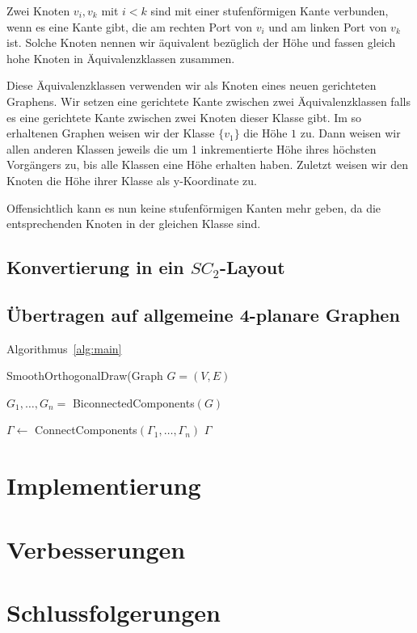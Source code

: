 \documentclass[a4paper]{scrreprt}
\theoremstyle{definition}
\begin{document}
Zwei Knoten $v_i, v_k$ mit $i < k$ sind mit einer stufenförmigen Kante verbunden, wenn es eine Kante gibt, die am rechten Port von $v_i$ und am linken Port von $v_k$ ist. Solche Knoten nennen wir äquivalent bezüglich der Höhe und fassen gleich hohe Knoten in Äquivalenzklassen zusammen.

Diese Äquivalenzklassen verwenden wir als Knoten eines neuen gerichteten Graphens. Wir setzen eine gerichtete Kante zwischen zwei Äquivalenzklassen falls es eine gerichtete Kante zwischen zwei Knoten dieser Klasse gibt. Im so erhaltenen Graphen weisen wir der Klasse $\{v_1\}$ die Höhe $1$ zu. Dann weisen wir allen anderen Klassen jeweils die um 1 inkrementierte Höhe ihres höchsten Vorgängers zu, bis alle Klassen eine Höhe erhalten haben. Zuletzt weisen wir den Knoten die Höhe ihrer Klasse als y-Koordinate zu.

Offensichtlich kann es nun keine stufenförmigen Kanten mehr geben, da die entsprechenden Knoten in der gleichen Klasse sind.

\section{Konvertierung in ein $SC_2$-Layout}



\section{Übertragen auf allgemeine 4-planare Graphen}

Algorithmus~\ref{alg:main}

\begin{algorithm}[ht]
  \caption{SmoothOrthogonalDraw(Graph $G = (V,E)$}
  \label{alg:main}
  
  $G_1, \dots, G_n =$ BiconnectedComponents$(G)$ \;
  
  $\Gamma \leftarrow$ ConnectComponents$(\Gamma_1, \dots, \Gamma_n)$ \;
  \Return $\Gamma$
\end{algorithm}


\chapter{Implementierung}

\chapter{Verbesserungen}

\chapter{Schlussfolgerungen}








\end{document}

